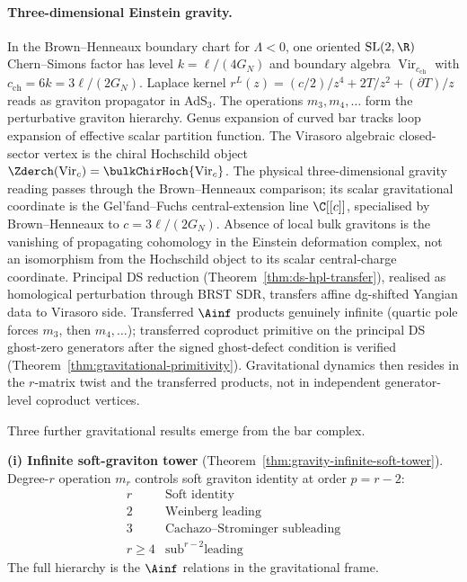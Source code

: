 \paragraph{Three-dimensional Einstein gravity.}
In the Brown--Henneaux boundary chart for $\Lambda < 0$, one oriented
$\mathrm{SL}(2,\R)$ Chern--Simons factor has level
$k = \ell/(4G_N)$ and boundary algebra
$\operatorname{Vir}_{c_{\mathrm{ch}}}$ with
$c_{\mathrm{ch}}=6k=3\ell/(2G_N)$. Laplace kernel
$r^L(z) = (c/2)/z^4 + 2T/z^2 + (\partial T)/z$ reads as graviton
propagator in AdS$_3$. The operations
$m_3, m_4, \ldots$ form the perturbative graviton hierarchy.
Genus expansion of curved bar tracks loop expansion of effective
scalar partition function. The Virasoro algebraic closed-sector vertex
is the chiral Hochschild object
$\Zderch(\operatorname{Vir}_c) = \bulkChirHoch{\operatorname{Vir}_c}$.
The physical three-dimensional gravity reading passes through the
Brown--Henneaux comparison; its scalar gravitational coordinate is the Gel'fand--Fuchs
central-extension line $\C[[c]]$, specialised by Brown--Henneaux to
$c = 3\ell/(2G_N)$. Absence of local bulk gravitons is the vanishing
of propagating cohomology in the Einstein deformation complex, not an
isomorphism from the Hochschild object to its scalar central-charge
coordinate. Principal DS reduction
(Theorem~\ref{thm:ds-hpl-transfer}), realised as homological
perturbation through BRST SDR, transfers
affine dg-shifted Yangian data to Virasoro side. Transferred
$\Ainf$ products genuinely infinite (quartic pole forces $m_3$,
then $m_4, \ldots$); transferred coproduct primitive on the
principal DS ghost-zero generators after the signed ghost-defect
condition is verified
(Theorem~\ref{thm:gravitational-primitivity}). Gravitational
dynamics then resides in the \(r\)-matrix twist and the transferred
products, not in independent generator-level coproduct vertices.

Three further gravitational results emerge from the bar complex.

\smallskip\textbf{(i) Infinite soft-graviton tower}
(Theorem~\ref{thm:gravity-infinite-soft-tower}). Degree-$r$
operation $m_r$ controls soft graviton identity at order
$p = r - 2$:
\[
\begin{array}{c|l}
r & \text{Soft identity} \\
\hline
2 & \text{Weinberg leading} \\
3 & \text{Cachazo--Strominger subleading} \\
r\ge 4 & \text{sub}^{r-2}\text{leading}
\end{array}
\]
The full hierarchy is the $\Ainf$ relations in the gravitational
frame.


